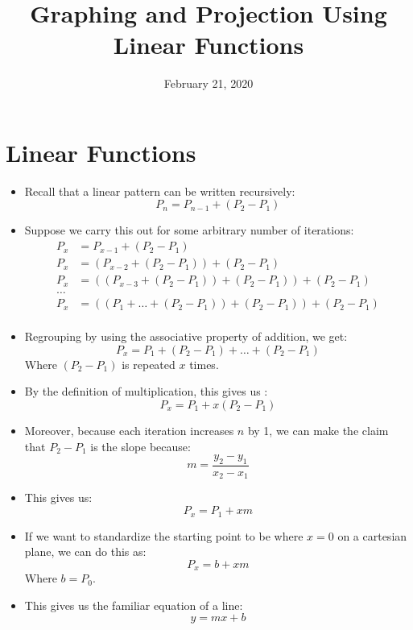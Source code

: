 \documentclass{article}
\title{Graphing and Projection Using Linear Functions}
\date{February 21, 2020}
\begin{document}
\maketitle

\section*{Linear Functions}
\begin{itemize}
    \item Recall that a linear pattern can be written recursively:
	\[
	P_n = P_{n-1} + (P_2 - P_1)
	\]

    \item Suppose we carry this out for some arbitrary number of iterations:
    \begin{align*}
    P_x &= P_{x-1} + (P_2 - P_1) \\
    P_x &= (P_{x-2} + (P_2 - P_1)) + (P_2 - P_1) \\
    P_x &= ((P_{x-3} + (P_2 - P_1)) + (P_2 - P_1)) + (P_2 - P_1) \\
    \ldots &\\
    P_x &= ((P_1 + \ldots + (P_2 - P_1)) + (P_2 - P_1)) + (P_2 - P_1) \\
    \end{align*} 

    \item Regrouping by using the associative property of addition, we get:
    \[
    P_x = P_1 + (P_2 - P_1) + \ldots + (P_2 - P_1)
    \]
    Where $(P_2 - P_1)$ is repeated $x$ times.  

    \item By the definition of multiplication, this gives us :
    \[
    P_x = P_1 + x(P_2 - P_1)
    \]

    \item Moreover, because each iteration increases $n$ by 1, we can make the
    claim that $P_2 - P_1$ is the slope because:
    \[
        m = \displaystyle\frac{y_2 - y_1} {x_2 - x_1}
    \]

    \item This gives us:
    \[
    P_x = P_1 + xm
    \]

    \item If we want to standardize the starting point to be where $x=0$ on
        a cartesian plane, we can do this as:
        \[
        P_x = b + xm
        \]
        Where $b=P_0$.
    \item This gives us the familiar equation of a line:
        \[
        \boxed{y = mx + b}
        \]


\end{itemize}
\end{document}
